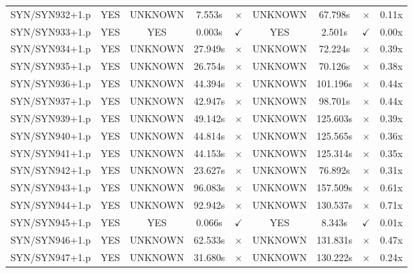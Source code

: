 \documentclass[a4paper,10pt]{article}
\begin{document}
\begin{longtable}{lcccccccc}
SYN/SYN932+1.p & YES & UNKNOWN & 7.553s & \cellcolor{mismatchcolor}$\times$ & UNKNOWN & 67.798s & \cellcolor{mismatchcolor}$\times$ & 0.11x \\
SYN/SYN933+1.p & YES & YES & 0.003s & \cellcolor{matchcolor}$\checkmark$ & YES & 2.501s & \cellcolor{matchcolor}$\checkmark$ & 0.00x \\
SYN/SYN934+1.p & YES & UNKNOWN & 27.949s & \cellcolor{mismatchcolor}$\times$ & UNKNOWN & 72.224s & \cellcolor{mismatchcolor}$\times$ & 0.39x \\
SYN/SYN935+1.p & YES & UNKNOWN & 26.754s & \cellcolor{mismatchcolor}$\times$ & UNKNOWN & 70.126s & \cellcolor{mismatchcolor}$\times$ & 0.38x \\
SYN/SYN936+1.p & YES & UNKNOWN & 44.394s & \cellcolor{mismatchcolor}$\times$ & UNKNOWN & 101.196s & \cellcolor{mismatchcolor}$\times$ & 0.44x \\
SYN/SYN937+1.p & YES & UNKNOWN & 42.947s & \cellcolor{mismatchcolor}$\times$ & UNKNOWN & 98.701s & \cellcolor{mismatchcolor}$\times$ & 0.44x \\
SYN/SYN939+1.p & YES & UNKNOWN & 49.142s & \cellcolor{mismatchcolor}$\times$ & UNKNOWN & 125.603s & \cellcolor{mismatchcolor}$\times$ & 0.39x \\
SYN/SYN940+1.p & YES & UNKNOWN & 44.814s & \cellcolor{mismatchcolor}$\times$ & UNKNOWN & 125.565s & \cellcolor{mismatchcolor}$\times$ & 0.36x \\
SYN/SYN941+1.p & YES & UNKNOWN & 44.153s & \cellcolor{mismatchcolor}$\times$ & UNKNOWN & 125.314s & \cellcolor{mismatchcolor}$\times$ & 0.35x \\
SYN/SYN942+1.p & YES & UNKNOWN & 23.627s & \cellcolor{mismatchcolor}$\times$ & UNKNOWN & 76.892s & \cellcolor{mismatchcolor}$\times$ & 0.31x \\
SYN/SYN943+1.p & YES & UNKNOWN & 96.083s & \cellcolor{mismatchcolor}$\times$ & UNKNOWN & 157.509s & \cellcolor{mismatchcolor}$\times$ & 0.61x \\
SYN/SYN944+1.p & YES & UNKNOWN & 92.942s & \cellcolor{mismatchcolor}$\times$ & UNKNOWN & 130.537s & \cellcolor{mismatchcolor}$\times$ & 0.71x \\
SYN/SYN945+1.p & YES & YES & 0.066s & \cellcolor{matchcolor}$\checkmark$ & YES & 8.343s & \cellcolor{matchcolor}$\checkmark$ & 0.01x \\
SYN/SYN946+1.p & YES & UNKNOWN & 62.533s & \cellcolor{mismatchcolor}$\times$ & UNKNOWN & 131.831s & \cellcolor{mismatchcolor}$\times$ & 0.47x \\
SYN/SYN947+1.p & YES & UNKNOWN & 31.680s & \cellcolor{mismatchcolor}$\times$ & UNKNOWN & 130.222s & \cellcolor{mismatchcolor}$\times$ & 0.24x \\

\end{longtable}
\end{document}
